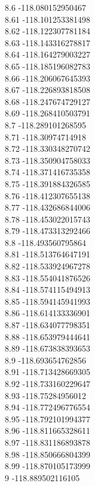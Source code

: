 {8.6	-118.080152950467\\
8.61	-118.101253381498\\
8.62	-118.122307781184\\
8.63	-118.143316278817\\
8.64	-118.164279003227\\
8.65	-118.185196082783\\
8.66	-118.206067645393\\
8.67	-118.226893818508\\
8.68	-118.247674729127\\
8.69	-118.268410503791\\
8.7	-118.289101268595\\
8.71	-118.30974714918\\
8.72	-118.330348270742\\
8.73	-118.350904758033\\
8.74	-118.371416735358\\
8.75	-118.391884326585\\
8.76	-118.412307655138\\
8.77	-118.432686844006\\
8.78	-118.453022015743\\
8.79	-118.473313292466\\
8.8	-118.493560795864\\
8.81	-118.513764647191\\
8.82	-118.533924967278\\
8.83	-118.554041876526\\
8.84	-118.574115494913\\
8.85	-118.594145941993\\
8.86	-118.614133336901\\
8.87	-118.634077798351\\
8.88	-118.653979444641\\
8.89	-118.673838393653\\
8.9	-118.693654762856\\
8.91	-118.713428669305\\
8.92	-118.733160229647\\
8.93	-118.75284956012\\
8.94	-118.772496776554\\
8.95	-118.792101994377\\
8.96	-118.811665328611\\
8.97	-118.831186893878\\
8.98	-118.850666804399\\
8.99	-118.870105173999\\
9	-118.889502116105\\
}
